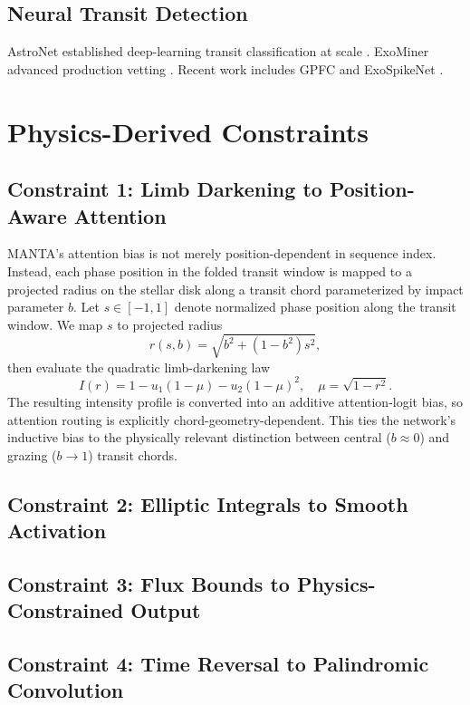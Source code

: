 \documentclass[11pt]{article}
\begin{document}
\subsection{Neural Transit Detection}
AstroNet established deep-learning transit classification at scale
\citep{shalluevanderburg2018}. ExoMiner advanced production vetting
\citep{valizadegan2021}. Recent work includes GPFC and ExoSpikeNet
\citep{kunimoto2024gpfc, exospikenet2024}.

\section{Physics-Derived Constraints}
\subsection{Constraint 1: Limb Darkening to Position-Aware Attention}
MANTA's attention bias is not merely position-dependent in sequence index.
Instead, each phase position in the folded transit window is mapped to a
projected radius on the stellar disk along a transit chord parameterized by
impact parameter $b$. Let $s \in [-1,1]$ denote normalized phase position along
the transit window. We map $s$ to projected radius
\begin{equation}
  r(s,b) = \sqrt{b^2 + (1-b^2)s^2},
\end{equation}
then evaluate the quadratic limb-darkening law
\begin{equation}
  I(r) = 1 - u_1\left(1-\mu\right) - u_2\left(1-\mu\right)^2,
  \quad \mu = \sqrt{1-r^2}.
\end{equation}
The resulting intensity profile is converted into an additive attention-logit
bias, so attention routing is explicitly chord-geometry-dependent. This ties
the network's inductive bias to the physically relevant distinction between
central ($b \approx 0$) and grazing ($b \rightarrow 1$) transit chords.
\subsection{Constraint 2: Elliptic Integrals to Smooth Activation}
\subsection{Constraint 3: Flux Bounds to Physics-Constrained Output}
\subsection{Constraint 4: Time Reversal to Palindromic Convolution}
\end{document}
